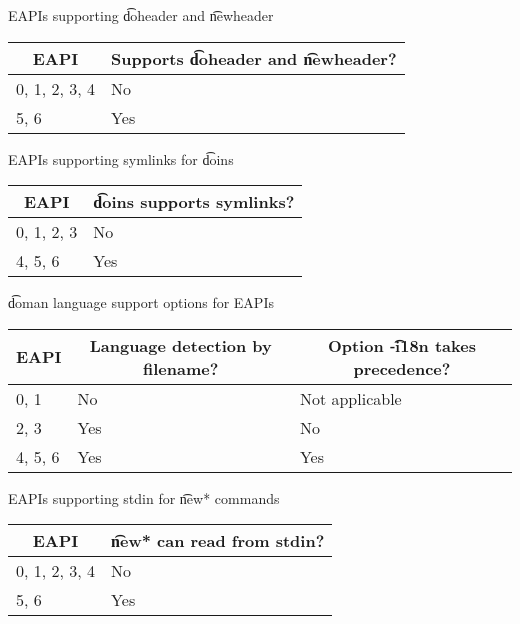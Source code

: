 \begin{centertable}{EAPIs supporting \t{doheader} and \t{newheader}}
    \label{tab:doheader-table}
    \begin{tabular}{ll}
      \toprule
      \multicolumn{1}{c}{\textbf{EAPI}} &
      \multicolumn{1}{c}{\textbf{Supports \t{doheader} and \t{newheader}?}} \\
      \midrule
      0, 1, 2, 3, 4     & No  \\
      5, 6              & Yes \\
      \bottomrule
    \end{tabular}
\end{centertable}

\begin{centertable}{EAPIs supporting symlinks for \t{doins}}
    \label{tab:doins-table}
    \begin{tabular}{ll}
      \toprule
      \multicolumn{1}{c}{\textbf{EAPI}} &
      \multicolumn{1}{c}{\textbf{\t{doins} supports symlinks?}} \\
      \midrule
      0, 1, 2, 3        & No  \\
      4, 5, 6           & Yes \\
      \bottomrule
    \end{tabular}
\end{centertable}

\begin{centertable}{\t{doman} language support options for EAPIs}
    \label{tab:doman-table}
    \begin{tabular}{lll}
      \toprule
      \multicolumn{1}{c}{\textbf{EAPI}} &
      \multicolumn{1}{c}{\textbf{Language detection by filename?}} &
      \multicolumn{1}{c}{\textbf{Option \t{-i18n} takes precedence?}} \\
      \midrule
      0, 1              & No  & Not applicable \\
      2, 3              & Yes & No             \\
      4, 5, 6           & Yes & Yes            \\
      \bottomrule
    \end{tabular}
\end{centertable}

\begin{centertable}{EAPIs supporting stdin for \t{new*} commands}
    \label{tab:newfoo-stdin-table}
    \begin{tabular}{ll}
      \toprule
      \multicolumn{1}{c}{\textbf{EAPI}} &
      \multicolumn{1}{c}{\textbf{\t{new*} can read from stdin?}} \\
      \midrule
      0, 1, 2, 3, 4     & No  \\
      5, 6              & Yes \\
      \bottomrule
    \end{tabular}
\end{centertable}

